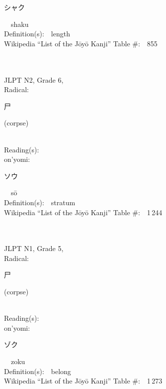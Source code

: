 \begin{multicols}{2}
{\hspace*{2em}}{\begin{CJK}{UTF8}{min} シャク \end{CJK}}\ \ shaku\ \ \\
Definition(s):\ \ length \\
Wikipedia ``List of the J\=oy\=o Kanji'' Table \#:\ \ 855 \\
\ \ \\
{\fontsize{34pt}{40pt}  }\ \ \\  %
{JLPT N2, Grade 6, \\Radical:\ \ {\begin{CJK}{UTF8}{min} 尸 \end{CJK}} (corpse) } \\
Reading(s):\ \ \\
{\hspace*{1em}}on'yomi:\ \ \\
{\hspace*{2em}}{\begin{CJK}{UTF8}{min} ソウ \end{CJK}}\ \ s\=o\ \ \\
Definition(s):\ \ stratum \\
Wikipedia ``List of the J\=oy\=o Kanji'' Table \#:\ \ 1\,244 \\
\ \ \\
{\fontsize{34pt}{40pt}  }\ \ \\  %
{JLPT N1, Grade 5, \\Radical:\ \ {\begin{CJK}{UTF8}{min} 尸 \end{CJK}} (corpse) } \\
Reading(s):\ \ \\
{\hspace*{1em}}on'yomi:\ \ \\
{\hspace*{2em}}{\begin{CJK}{UTF8}{min} ゾク \end{CJK}}\ \ zoku\ \ \\
Definition(s):\ \ belong \\
Wikipedia ``List of the J\=oy\=o Kanji'' Table \#:\ \ 1\,273 \\

\end{multicols}
